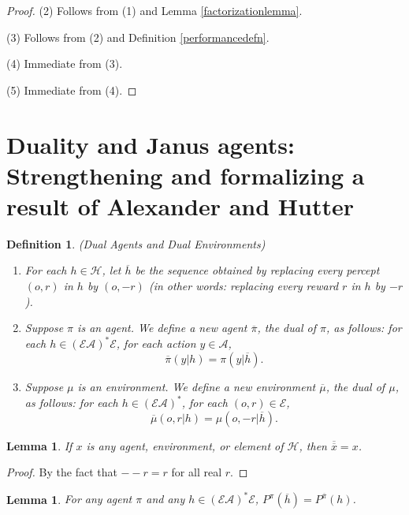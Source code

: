 \documentclass[twoside]{article}
\newtheorem{definition}[theorem]{Definition}
\newtheorem{lemma}[theorem]{Lemma}
\begin{document}
\begin{proof}
    (2) Follows from (1) and Lemma \ref{factorizationlemma}.

    (3) Follows from (2) and Definition \ref{performancedefn}.

    (4) Immediate from (3).

    (5) Immediate from (4).
\end{proof}

\section{Duality and Janus agents:
Strengthening and formalizing a result of Alexander and Hutter}

\begin{definition}
\label{dualagentsdefn}
(Dual Agents and Dual Environments)
\begin{enumerate}
    \item
    For each $h\in\mathcal H$, let $\overline h$ be the sequence obtained
    by replacing every percept $(o,r)$ in $h$ by $(o,-r)$ (in other words:
    replacing every reward $r$ in $h$ by $-r$).
    \item
    Suppose $\pi$ is an agent.
    We define a new agent $\overline \pi$, the \emph{dual} of $\pi$,
    as follows:
    for each $h\in (\mathcal E\mathcal A)^*\mathcal E$,
    for each action $y\in\mathcal A$,
    \[\overline\pi(y|h)=\pi(y|\overline h).\]
    \item
    Suppose $\mu$ is an environment.
    We define a new environment $\overline\mu$, the \emph{dual} of $\mu$,
    as follows:
    for each $h\in (\mathcal E\mathcal A)^*$,
    for each $(o,r)\in\mathcal E$,
    \[\overline\mu(o,r|h)=\mu(o,-r|\overline h).\]
\end{enumerate}
\end{definition}

\begin{lemma}
\label{doublenegationlemma}
    If $x$ is any agent, environment, or element of $\mathcal H$,
    then $\overline{\overline x}=x$.
\end{lemma}

\begin{proof}
    By the fact that $--r=r$ for all real $r$.
\end{proof}

\begin{lemma}
\label{asteriskcommuteswithoverlinelemma}
    For any agent $\pi$ and any $h\in(\mathcal E\mathcal A)^*\mathcal E$,
    $P^\pi(\overline h)=P^{\overline{\pi}}(h)$.
\end{lemma}
\end{document}
